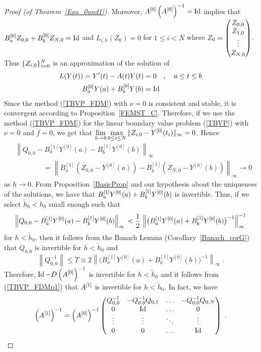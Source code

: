 \begin{proof}[Proof (of Theorem~\ref{Equ_0and1})]
Moreover, $\displaystyle A^{[0]}\left(A^{[0]}\right)^{-1} = \operatorname{Id}$ implies that
$\displaystyle B_a^{[0]} Z_{0,0} + B_b^{[0]} Z_{N,0} = \operatorname{Id}$ and
$L_{i,h}(Z_0) = 0$ for $1 \leq i < N$ where
$\displaystyle Z_0 = \begin{pmatrix} Z_{0,0} \\ Z_{1,0} \\ \vdots \\
Z_{N,0} \end{pmatrix}$.
Thus $\displaystyle \{ Z_{i,0} \}_{i=0}^N$ is an
approximation of the solution of
\begin{align*}
L(Y(t)) = Y'(t) - A(t)Y(t) &= 0 \quad ,
\quad a \leq t \leq b\\ 
B_a^{[0]}Y(a) + B_b^{[0]}Y(b) &= \operatorname{Id}
\end{align*}
Since the method (\ref{TBVP_FDM}) with $\nu=0$ is
consistent and stable, it is convergent according to
Proposition~\ref{FEMST_C}.  Therefore, if we use the method
(\ref{TBVP_FDM}) for the linear boundary value problem
(\ref{TBVP}) with $\nu =0$ and $f=0$, we get that
$\displaystyle
\lim_{h \to 0} \max_{0\leq i \leq N} \| Z_{i,0} - Y^{[0]}(t_i)\|_\infty = 0$.
Hence
\begin{equation}\label{TBVP_FDMp2}
\begin{split}
&\left\| Q_{0,0} - B_a^{[1]}Y^{[0]}(a) -B_b^{[1]}Y^{[0]}(b) \right\|_\infty \\
&\qquad \qquad
= \left\| B_a^{[1]}(Z_{0,0} -Y^{[0]}(a)) -B_b^{[1]}(Z_{N,0} -Y^{[0]}(b))
\right\|_\infty \to 0
\end{split}
\end{equation}
as $h \to 0$.  From Proposition~\ref{BasicProp} and our hypothesis
about the uniqueness of the solutions, we have that
$\displaystyle B_a^{[1]} Y^{[0]}(a) + B_b^{[1]} Y^{[0]}(b)$ is
invertible.  Thus, if we select $\tilde{h}_0 < h_0$ small enough such that
\[
\left\| Q_{0,0} - B_a^{[1]}Y^{[0]}(a) -B_b^{[1]}Y^{[0]}(b) \right\|_\infty \\
< \frac{1}{2}\,\left\| \big(B_a^{[1]} Y^{[0]}(a)
  + B_b^{[1]} Y^{[0]}(b)\big)^{-1}\right\|^{-1}_\infty
\]
for $h <\tilde{h}_0$, then it follows from the Banach Lemma
(Corollary~\ref{Banach_corG}) that $Q_{0,0}$ is invertible for
$h < \tilde{h}_0$ and
\[
\left\|Q_{0,0}^{-1}\right\| \leq T \equiv
2 \left\| \big(B_a^{[1]} Y^{[0]}(a)
  + B_b^{[1]} Y^{[0]}(b)\big)^{-1}\right\|_\infty \ .
\]
Therefore, $\displaystyle \operatorname{Id} - D\left(A^{[0]}\right)^{-1}$
is invertible for $h < \tilde{h}_0$ and it follows from
(\ref{TBVP_FDMp1}) that $\displaystyle A^{[1]}$ is invertible for
$h < \tilde{h}_0$.  In fact, we have
\begin{equation}\label{TBVP_FDMp3}
\left(A^{[1]}\right)^{-1} = \left(A^{[0]}\right)^{-1} \begin{pmatrix}
Q^{-1}_{0,0} & -Q^{-1}_{0,0} Q_{0,1}  &
\ldots & -Q^{-1}_{0,0} Q_{0,N} \\
0 & \operatorname{Id} & \ldots & 0 \\
\vdots & \vdots & \ddots & \vdots \\
0 & 0 & \ldots & \operatorname{Id}
\end{pmatrix} \ .
\end{equation}


\end{proof}
